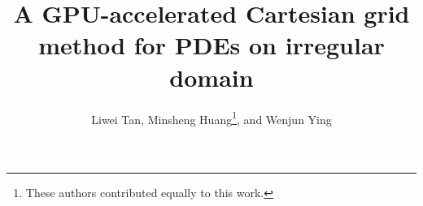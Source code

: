 \documentclass[mathpazo]{cicp}
\begin{document}
\title{A GPU-accelerated Cartesian grid method for PDEs on irregular domain}


\author[Liwei Tan et.~al.]{Liwei Tan\footnotemark[2],
      Minsheng Huang\footnote[2]{These authors contributed equally to this work.}, and Wenjun Ying\comma\corrauth}
\address{\ School of Mathematical Sciences, 
            Shanghai Jiao Tong University, 
            Shanghai 200240, P.R. China. \\
          \ School of Mathematical Sciences, MOE-LSC and Institute of Natural Sciences, 
          Shanghai Jiao Tong University, Minhang, 
          Shanghai 200240, P.R. China.}

\end{document}
